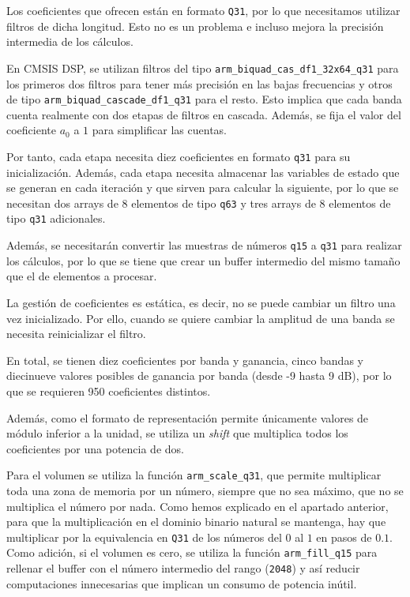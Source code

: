 Los coeficientes que ofrecen están en formato \texttt{Q31}, por lo que necesitamos utilizar filtros de dicha longitud. Esto no es un problema e incluso mejora la precisión intermedia de los cálculos. 

En CMSIS DSP, se utilizan filtros del tipo \texttt{arm\_biquad\_cas\_df1\_32x64\_q31} para los primeros dos filtros para tener más precisión en las bajas frecuencias y otros de tipo \texttt{arm\_biquad\_cascade\_df1\_q31} para el resto. Esto implica que cada banda cuenta realmente con dos etapas de filtros en cascada. Además, se fija el valor del coeficiente $a_0$ a $1$ para simplificar las cuentas. 

Por tanto, cada etapa necesita diez coeficientes en formato \texttt{q31} para su inicialización. Además, cada etapa necesita almacenar las variables de estado que se generan en cada iteración y que sirven para calcular la siguiente, por lo que se necesitan dos arrays de 8 elementos de tipo \texttt{q63} y tres arrays de 8 elementos de tipo \texttt{q31} adicionales.

Además, se necesitarán convertir las muestras de números \texttt{q15} a \texttt{q31} para realizar los cálculos, por lo que se tiene que crear un buffer intermedio del mismo tamaño que el de elementos a procesar.

La gestión de coeficientes es estática, es decir, no se puede cambiar un filtro una vez inicializado. Por ello, cuando se quiere cambiar la amplitud de una banda se necesita reinicializar el filtro. 

En total, se tienen diez coeficientes por banda y ganancia, cinco bandas y diecinueve valores posibles de ganancia por banda (desde -9 hasta 9 dB), por lo que se requieren 950 coeficientes distintos.

Además, como el formato de representación permite únicamente valores de módulo inferior a la unidad, se utiliza un \textit{shift} que multiplica todos los coeficientes por una potencia de dos.

Para el volumen se utiliza la función \texttt{arm\_scale\_q31}, que permite multiplicar toda una zona de memoria por un número, siempre que no sea máximo, que no se multiplica el número por nada. Como hemos explicado en el apartado anterior, para que la multiplicación en el dominio binario natural se mantenga, hay que multiplicar por la equivalencia en \texttt{Q31} de los números del $0$ al $1$ en pasos de $0.1$. Como adición, si el volumen es cero, se utiliza la función \texttt{arm\_fill\_q15} para rellenar el buffer con el número intermedio del rango (\texttt{2048}) y así reducir computaciones innecesarias que implican un consumo de potencia inútil.

